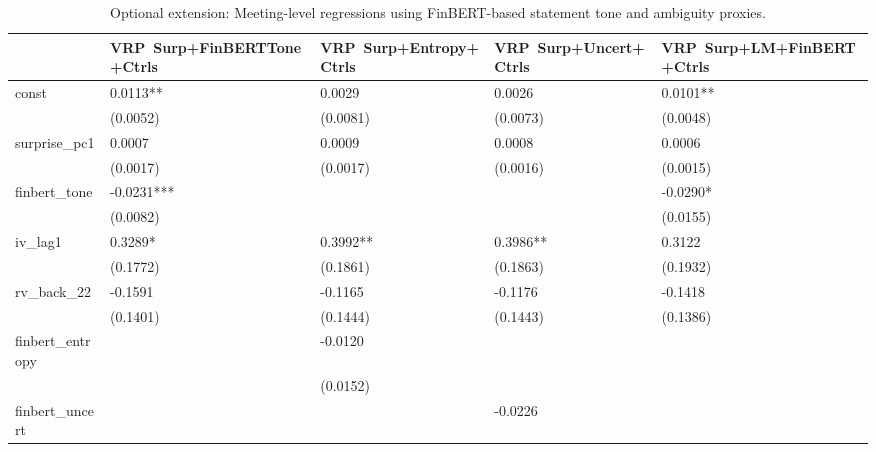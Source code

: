 \begin{table}
\caption{Optional extension: Meeting-level regressions using FinBERT-based statement tone and ambiguity proxies.}
\label{tab:meet_finbert}
\begin{center}
\begin{tabular}{lllll}
\hline
                 & VRP~Surp+FinBERTTone+Ctrls & VRP~Surp+Entropy+Ctrls & VRP~Surp+Uncert+Ctrls & VRP~Surp+LM+FinBERT+Ctrls  \\
\hline
const            & 0.0113**                   & 0.0029                 & 0.0026                & 0.0101**                   \\
                 & (0.0052)                   & (0.0081)               & (0.0073)              & (0.0048)                   \\
surprise\_pc1    & 0.0007                     & 0.0009                 & 0.0008                & 0.0006                     \\
                 & (0.0017)                   & (0.0017)               & (0.0016)              & (0.0015)                   \\
finbert\_tone    & -0.0231***                 &                        &                       & -0.0290*                   \\
                 & (0.0082)                   &                        &                       & (0.0155)                   \\
iv\_lag1         & 0.3289*                    & 0.3992**               & 0.3986**              & 0.3122                     \\
                 & (0.1772)                   & (0.1861)               & (0.1863)              & (0.1932)                   \\
rv\_back\_22     & -0.1591                    & -0.1165                & -0.1176               & -0.1418                    \\
                 & (0.1401)                   & (0.1444)               & (0.1443)              & (0.1386)                   \\
finbert\_entropy &                            & -0.0120                &                       &                            \\
                 &                            & (0.0152)               &                       &                            \\
finbert\_uncert  &                            &                        & -0.0226               &                            \\

\end{tabular}
\end{center}
\end{table}
